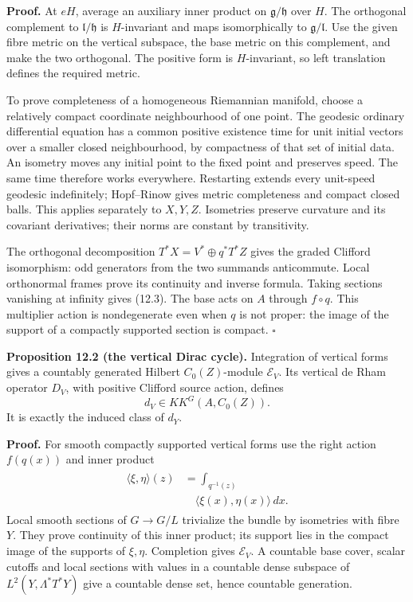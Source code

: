 \documentclass[
  11pt,
]{article}
\begin{document}
\textbf{Proof.} At \(eH\), average an auxiliary inner product on
\(\mathfrak g/\mathfrak h\) over \(H\). The orthogonal complement to
\(\mathfrak l/\mathfrak h\) is \(H\)-invariant and maps isomorphically
to \(\mathfrak g/\mathfrak l\). Use the given fibre metric on the
vertical subspace, the base metric on this complement, and make the two
orthogonal. The positive form is \(H\)-invariant, so left translation
defines the required metric.

To prove completeness of a homogeneous Riemannian manifold, choose a
relatively compact coordinate neighbourhood of one point. The geodesic
ordinary differential equation has a common positive existence time for
unit initial vectors over a smaller closed neighbourhood, by compactness
of that set of initial data. An isometry moves any initial point to the
fixed point and preserves speed. The same time therefore works
everywhere. Restarting extends every unit-speed geodesic indefinitely;
Hopf--Rinow gives metric completeness and compact closed balls. This
applies separately to \(X,Y,Z\). Isometries preserve curvature and its
covariant derivatives; their norms are constant by transitivity.

The orthogonal decomposition \(T^*X=V^*\oplus q^*T^*Z\) gives the graded
Clifford isomorphism: odd generators from the two summands anticommute.
Local orthonormal frames prove its continuity and inverse formula.
Taking sections vanishing at infinity gives (12.3). The base acts on
\(A\) through \(f\circ q\). This multiplier action is nondegenerate even
when \(q\) is not proper: the image of the support of a compactly
supported section is compact. \(\square\)

\textbf{Proposition 12.2 (the vertical Dirac cycle).} Integration of
vertical forms gives a countably generated Hilbert \(C_0(Z)\)-module
\(\mathcal E_V\). Its vertical de Rham operator \(D_V\), with positive
Clifford source action, defines \[
d_V\in KK^G(A,C_0(Z)).
\tag{12.4}
\] It is exactly the induced class of \(d_Y\).

\textbf{Proof.} For smooth compactly supported vertical forms use the
right action \(f(q(x))\) and inner product \[
\begin{gathered}
\begin{aligned}
\langle\xi,\eta\rangle(z)&=\int_{q^{-1}(z)}\\
&\quad\langle\xi(x),\eta(x)\rangle\,dx.
\end{aligned}
\end{gathered}
\tag{12.5}
\] Local smooth sections of \(G\to G/L\) trivialize the bundle by
isometries with fibre \(Y\). They prove continuity of this inner
product; its support lies in the compact image of the supports of
\(\xi,\eta\). Completion gives \(\mathcal E_V\). A countable base cover,
scalar cutoffs and local sections with values in a countable dense
subspace of \(L^2(Y,\Lambda^*T^*Y)\) give a countable dense set, hence
countable generation.
\end{document}
